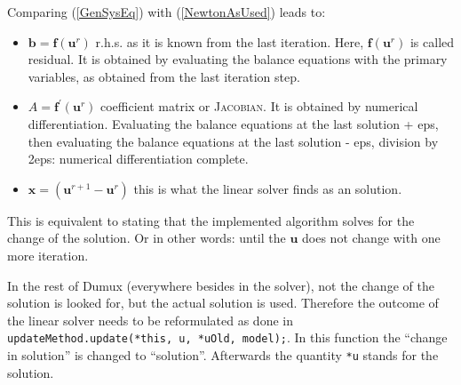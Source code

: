 Comparing (\ref{GenSysEq}) with (\ref{NewtonAsUsed}) leads to:
\begin{itemize}
\item $\textbf{b} = \textbf{f}(\textbf{u}^r)$ r.h.s. as it is known from the last iteration. Here, $\textbf{f}(\textbf{u}^r)$ is called residual. It is obtained by evaluating the balance equations with the primary variables, as obtained from the last iteration step.
\item $A=\textbf{f}^{\prime}(\textbf{u}^r)$ coefficient matrix or \textsc{Jacobian}. It is obtained by numerical differentiation. Evaluating the balance equations at the last solution + eps, then evaluating the balance equations at the last solution - eps, division by 2eps: numerical differentiation complete.
\item $\textbf{x} = (\textbf{u}^{r+1} - \textbf{u}^{r})$ this is what the linear solver finds as an solution. 
\end{itemize}

This is equivalent to stating that the implemented algorithm solves for the change of the solution. Or in other words: until the $\textbf{u}$ does not change with one more iteration.

In the rest of Dumux (everywhere besides in the solver), not the change of the solution is looked for, but the actual solution is used. Therefore the outcome of the linear solver needs to be reformulated as done in \verb+updateMethod.update(*this, u, *uOld, model);+. In this function the ``change in solution'' is changed to ``solution''. Afterwards the quantity \verb+*u+ stands for the solution.
